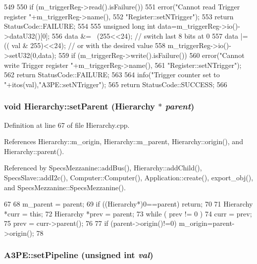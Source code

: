 \begin{DoxyCode}
549                                             {
550   if (m_triggerReg->read().isFailure()){
551     error("Cannot read Trigger register "+m_triggerReg->name(),
552         "Register::setNTrigger");
553     return StatusCode::FAILURE;
554   }
555   unsigned long int data=m_triggerReg->io()->dataU32()[0];
556   data &= ~(255<<24); // switch last 8 bits at 0
557   data |= (( val & 255)<<24);  // or with the desired value
558   m_triggerReg->io()->setU32(0,data);
559   if (m_triggerReg->write().isFailure()){
560     error("Cannot write Trigger register "+m_triggerReg->name(),
561         "Register::setNTrigger");
562     return StatusCode::FAILURE;
563   }
564   info("Trigger counter set to "+itos(val),"A3PE::setNTrigger");
565   return StatusCode::SUCCESS;
566 }
\end{DoxyCode}
\hypertarget{classHierarchy_a585ad1aeec16077a0e532ab8b4fc557b}{
\subsubsection[{setParent}]{\setlength{\rightskip}{0pt plus 5cm}void Hierarchy::setParent ({\bf Hierarchy} $\ast$ {\em parent})}}
\label{classHierarchy_a585ad1aeec16077a0e532ab8b4fc557b}


Definition at line 67 of file Hierarchy.cpp.

References Hierarchy::m\_\-origin, Hierarchy::m\_\-parent, Hierarchy::origin(), and Hierarchy::parent().

Referenced by SpecsMezzanine::addBus(), Hierarchy::addChild(), SpecsSlave::addI2c(), Computer::Computer(), Application::create(), export\_\-obj(), and SpecsMezzanine::SpecsMezzanine().


\begin{DoxyCode}
67                                               {
68   m_parent = parent;
69   if ((Hierarchy*)0==parent) return;
70 
71   Hierarchy *curr = this;
72   Hierarchy *prev = parent;
73   while ( prev != 0 ){
74     curr = prev;
75     prev = curr->parent();
76   }
77   if (parent->origin()!=0) m_origin=parent->origin();
78 }
\end{DoxyCode}
\hypertarget{classA3PE_a5b3840fc8edd14427ac9fb4def3171d3}{
\subsubsection[{setPipeline}]{ A3PE::setPipeline (unsigned int {\em val})}}
\label{classA3PE_a5b3840fc8edd14427ac9fb4def3171d3}


